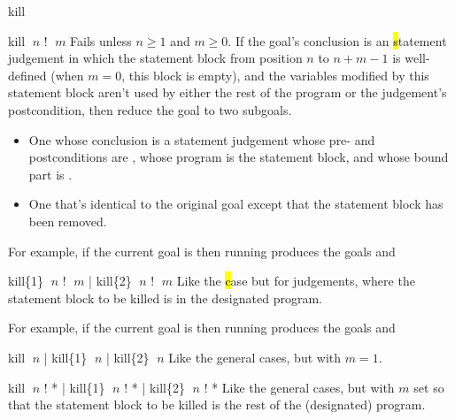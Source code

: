\begin{tactic}{kill}
  \begin{tsyntax}{kill $\;n$ ! $\;m$}
    Fails unless $n\geq 1$ and $m\geq 0$.
    If the goal's conclusion is an \hl statement judgement in which
    the statement block from position $n$ to $n + m - 1$ is well-defined
    (when $m = 0$, this block is empty), and the variables modified by
    this statement block aren't used by either the rest of the program or
    the judgement's postcondition, then reduce the goal to two subgoals.
    \begin{itemize}
    \item One whose conclusion is a \phl statement judgement whose pre-
       and postconditions are , whose program is the
       statement block, and whose bound part is .

    \item One that's identical to the original goal except that the
      statement block has been removed.
    \end{itemize}

    \medskip For example, if the current goal is
     then
    running 
    produces the goals
    and
  \end{tsyntax}

  \begin{tsyntax}{kill\{1\} $\;n$ ! $\;m$ | kill\{2\} $\;n$ ! $\;m$}
    Like the \hl case but for \prhl judgements, where the statement
    block to be killed is in the designated program.

    \medskip For example, if the current goal is
     then
    running 
    produces the goals
    and
  \end{tsyntax}

  \begin{tsyntax}{kill $\;n$ | kill\{1\} $\;n$ | kill\{2\} $\;n$}
    Like the general cases, but with $m = 1$.
  \end{tsyntax}

  \begin{tsyntax}{kill $\;n$ ! * | kill\{1\} $\;n$ ! * | kill\{2\} $\;n$ ! *}
    Like the general cases, but with $m$ set so that the statement
    block to be killed is the rest of the (designated) program.
  \end{tsyntax}
\end{tactic}
